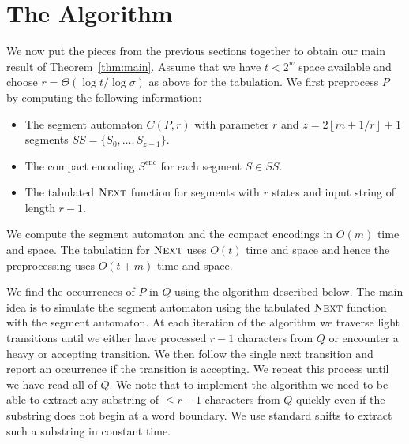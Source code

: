 \documentclass{article}
\newcommand{\enc}{\ensuremath{\mathrm{enc}}}
\newcommand{\Next}{\ensuremath{\textsc{Next}}}
\newcommand{\floor}[1]{\left\lfloor{#1}\right\rfloor}
\begin{document}
\section{The Algorithm}\label{sec:algorithm}
We now put the pieces from the previous sections together to obtain
our main result of Theorem~\ref{thm:main}. Assume that we have $t <
2^w$ space available and choose $r = \Theta(\log t/ \log \sigma)$ as
above for the tabulation. We first preprocess $P$ by computing the
following information:
\begin{itemize}
\item The segment automaton $C(P, r)$ with parameter $r$ and $z =
  2\floor{m+1/r}+1$ segments $SS = \{S_0, \ldots, S_{z-1}\}$.
\item The compact encoding $S^\enc$ for each segment $S \in SS$.
\item The tabulated $\Next$ function for segments with $r$ states and
  input string of length $r-1$.
\end{itemize}
We compute the segment automaton and the compact encodings in $O(m)$
time and space. The tabulation for $\Next$ uses $O(t)$ time and space
and hence the preprocessing uses $O(t + m)$ time and space.

We find the occurrences of $P$ in $Q$ using the algorithm described
below. The main idea is to simulate the segment automaton using the
tabulated $\Next$ function with the segment automaton. At each
iteration of the algorithm we traverse light transitions until we
either have processed $r-1$ characters from $Q$ or encounter a heavy or
accepting transition. We then follow the single next transition and
report an occurrence if the transition is accepting. We repeat this
process until we have read all of $Q$. We note that to implement the
algorithm we need to be able to extract any substring of $\leq r-1$
characters from $Q$ quickly even if the substring does not begin at a
word boundary. We use standard shifts to extract such a substring in
constant time.
\end{document}
